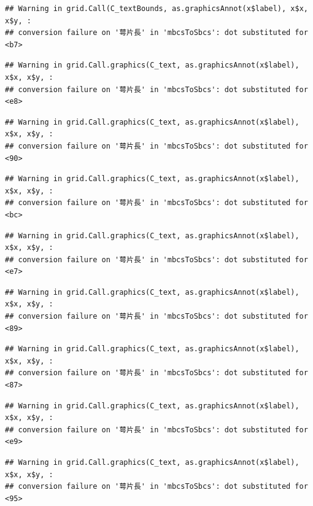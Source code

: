 \documentclass[
]{book}
\begin{document}
\begin{verbatim}
## Warning in grid.Call(C_textBounds, as.graphicsAnnot(x$label), x$x, x$y, :
## conversion failure on '萼片長' in 'mbcsToSbcs': dot substituted for <b7>
\end{verbatim}

\begin{verbatim}
## Warning in grid.Call.graphics(C_text, as.graphicsAnnot(x$label), x$x, x$y, :
## conversion failure on '萼片長' in 'mbcsToSbcs': dot substituted for <e8>
\end{verbatim}

\begin{verbatim}
## Warning in grid.Call.graphics(C_text, as.graphicsAnnot(x$label), x$x, x$y, :
## conversion failure on '萼片長' in 'mbcsToSbcs': dot substituted for <90>
\end{verbatim}

\begin{verbatim}
## Warning in grid.Call.graphics(C_text, as.graphicsAnnot(x$label), x$x, x$y, :
## conversion failure on '萼片長' in 'mbcsToSbcs': dot substituted for <bc>
\end{verbatim}

\begin{verbatim}
## Warning in grid.Call.graphics(C_text, as.graphicsAnnot(x$label), x$x, x$y, :
## conversion failure on '萼片長' in 'mbcsToSbcs': dot substituted for <e7>
\end{verbatim}

\begin{verbatim}
## Warning in grid.Call.graphics(C_text, as.graphicsAnnot(x$label), x$x, x$y, :
## conversion failure on '萼片長' in 'mbcsToSbcs': dot substituted for <89>
\end{verbatim}

\begin{verbatim}
## Warning in grid.Call.graphics(C_text, as.graphicsAnnot(x$label), x$x, x$y, :
## conversion failure on '萼片長' in 'mbcsToSbcs': dot substituted for <87>
\end{verbatim}

\begin{verbatim}
## Warning in grid.Call.graphics(C_text, as.graphicsAnnot(x$label), x$x, x$y, :
## conversion failure on '萼片長' in 'mbcsToSbcs': dot substituted for <e9>
\end{verbatim}

\begin{verbatim}
## Warning in grid.Call.graphics(C_text, as.graphicsAnnot(x$label), x$x, x$y, :
## conversion failure on '萼片長' in 'mbcsToSbcs': dot substituted for <95>
\end{verbatim}
\end{document}
